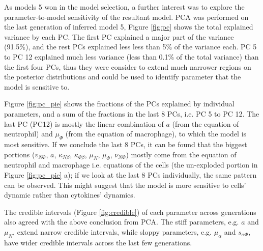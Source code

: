 As models 5 won in the model selection, a further interest was to explore the parameter-to-model sensitivity of the resultant model. PCA was performed on the last generation of inferred model 5, Figure \ref{fig:pc} shows the total explained variance by each PC. The first PC explained a major part of the variance (91.5\%), and the rest PCs explained less less than 5\% of the variance each. PC 5 to PC 12 explained much less variance (less than 0.1\% of the total variance) than the first four PCs, thus they were consider to extend much narrower regions on the posterior distributions and could be used to identify parameter that the model is sensitive to.

Figure \ref{fig:pc_pie} shows the fractions of the PCs explained by individual parameters, and a sum of the fractions in the last 8 PCs, i.e. PC 5 to PC 12. The last PC (PC12) is mostly the linear combination of $a$ (from the equation of neutrophil) and $\mu_\Phi$ (from the equation of macrophage), to which the model is most sensitive. If we conclude the last 8 PCs, it can be found that the biggest portions ($v_{N\Phi}$, $a$, $\kappa_{N\beta}$, $\kappa_{\Phi\beta}$, $\mu_N$, $\mu_\Phi$, $\nu_{N\Phi}$) mostly come from the equation of neutrophil and macrophage i.e. equations of the cells (the un-exploded portion in Figure \ref{fig:pc_pie} a); if we look at the last 8 PCs individually, the same pattern can be observed. This might suggest that the model is more sensitive to cells' dynamic rather than cytokines' dynamics.

The credible intervals (Figure \ref{fig:credible}) of each parameter across generations also agreed with the above conclusion from PCA. The stiff parameters, e.g. $a$ and $\mu_N$, extend narrow credible intervals, while sloppy parameters, e.g. $\mu_\alpha$ and $s_{\alpha\Phi}$, have wider credible intervals across the last few generations.


